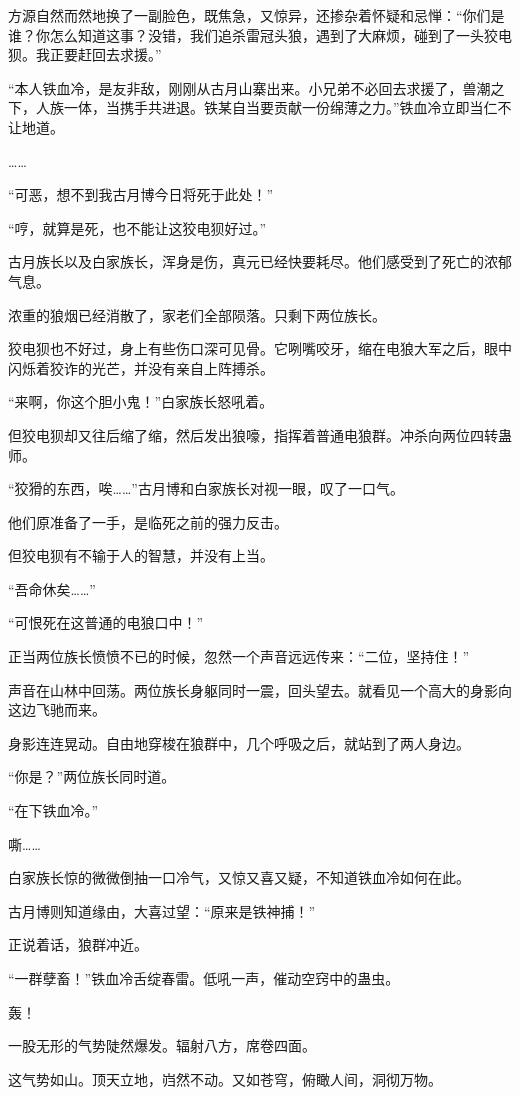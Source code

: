 \begin{this_body}
方源自然而然地换了一副脸色，既焦急，又惊异，还掺杂着怀疑和忌惮：“你们是谁？你怎么知道这事？没错，我们追杀雷冠头狼，遇到了大麻烦，碰到了一头狡电狈。我正要赶回去求援。”

“本人铁血冷，是友非敌，刚刚从古月山寨出来。小兄弟不必回去求援了，兽潮之下，人族一体，当携手共进退。铁某自当要贡献一份绵薄之力。”铁血冷立即当仁不让地道。

……

“可恶，想不到我古月博今日将死于此处！”

“哼，就算是死，也不能让这狡电狈好过。”

古月族长以及白家族长，浑身是伤，真元已经快要耗尽。他们感受到了死亡的浓郁气息。

浓重的狼烟已经消散了，家老们全部陨落。只剩下两位族长。

狡电狈也不好过，身上有些伤口深可见骨。它咧嘴咬牙，缩在电狼大军之后，眼中闪烁着狡诈的光芒，并没有亲自上阵搏杀。

“来啊，你这个胆小鬼！”白家族长怒吼着。

但狡电狈却又往后缩了缩，然后发出狼嚎，指挥着普通电狼群。冲杀向两位四转蛊师。

“狡猾的东西，唉……”古月博和白家族长对视一眼，叹了一口气。

他们原准备了一手，是临死之前的强力反击。

但狡电狈有不输于人的智慧，并没有上当。

“吾命休矣……”

“可恨死在这普通的电狼口中！”

正当两位族长愤愤不已的时候，忽然一个声音远远传来：“二位，坚持住！”

声音在山林中回荡。两位族长身躯同时一震，回头望去。就看见一个高大的身影向这边飞驰而来。

身影连连晃动。自由地穿梭在狼群中，几个呼吸之后，就站到了两人身边。

“你是？”两位族长同时道。

“在下铁血冷。”

嘶……

白家族长惊的微微倒抽一口冷气，又惊又喜又疑，不知道铁血冷如何在此。

古月博则知道缘由，大喜过望：“原来是铁神捕！”

正说着话，狼群冲近。

“一群孽畜！”铁血冷舌绽春雷。低吼一声，催动空窍中的蛊虫。

轰！

一股无形的气势陡然爆发。辐射八方，席卷四面。

这气势如山。顶天立地，岿然不动。又如苍穹，俯瞰人间，洞彻万物。


\end{this_body}
